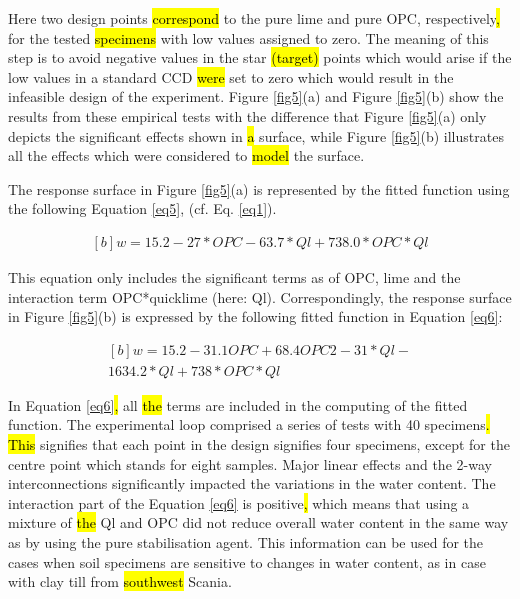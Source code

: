 \documentclass[eprint,
]{actapoly}
\begin{document}
Here two design points \hl{correspond }to the pure lime and pure OPC, respectively\hl{, }for the tested \hl{specimens }with low values assigned to zero. The meaning of this step is to avoid\hl{ }negative values in the star\hl{ (target) }points which would arise if the low values in a standard CCD \hl{were }set to zero which would result in the infeasible design of the experiment. Figure \ref{fig5}(a) and Figure \ref{fig5}(b) show\hl{ }the results from these empirical tests with the difference that\hl{ }Figure \ref{fig5}(a) only depicts the significant effects shown in \hl{a }surface, while\hl{ }Figure \ref{fig5}(b) illustrates all the effects which were considered to \hl{model }the surface. 

The response surface in Figure \ref{fig5}(a) is represented by the fitted function using the following Equation \ref{eq5}, (cf. Eq. \ref{eq1}). 

\begin{equation}\label{eq5}
\begin{aligned}[b]
w=15.2 -27*OPC-63.7*Ql+738.0*OPC*Ql 
\end{aligned}
\end{equation}

This equation only includes the significant terms as of OPC, lime and the interaction term OPC*quicklime (here: Ql). Correspondingly, the response surface in Figure \ref{fig5}(b) is expressed by the following fitted function in Equation \ref{eq6}:

\begin{equation}\label{eq6}
\begin{aligned}[b]
w=15.2-31.1OPC+68.4OPC2-31*Ql-\\1634.2*Ql+738*OPC*Ql
\end{aligned}
\end{equation}

In Equation \ref{eq6}\hl{, }all\hl{ the }terms are included in the computing of the fitted function. The experimental loop comprised a series of tests with 40 specimens\hl{. This }signifies that each point in the design signifies four specimens, except for the centre point which stands for eight samples. Major linear effects and the 2-way interconnections significantly impacted the variations in the water content. The interaction part of the Equation \ref{eq6} is positive\hl{, }which means that using a mixture of \hl{the }Ql and OPC did not reduce overall water content in the same way as by using the pure stabilisation agent. This information can be used for the cases when soil specimens are sensitive to changes in water content, as in\hl{ }case with clay till from \hl{southwest} Scania. 
\end{document}
